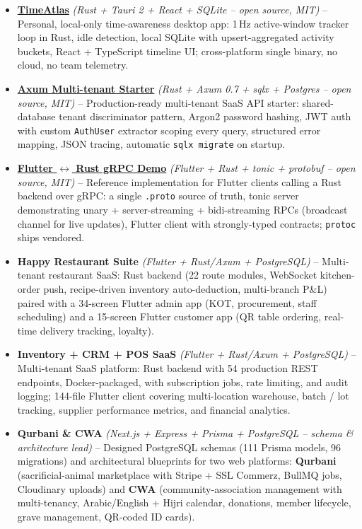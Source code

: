\documentclass[a4paper,10pt]{article}
\begin{document}
\begin{itemize}[leftmargin=*, noitemsep, topsep=2pt, parsep=0pt, partopsep=0pt]
    \item \href{https://github.com/Nahianether/rust-tauri-activity-monitor}{\textbf{TimeAtlas}} \textit{(Rust + Tauri 2 + React + SQLite -- open source, MIT)} -- Personal, local-only time-awareness desktop app: 1\,Hz active-window tracker loop in Rust, idle detection, local SQLite with upsert-aggregated activity buckets, React + TypeScript timeline UI; cross-platform single binary, no cloud, no team telemetry.
    \item \href{https://github.com/Nahianether/rust-axum-multitenant-starter}{\textbf{Axum Multi-tenant Starter}} \textit{(Rust + Axum 0.7 + sqlx + Postgres -- open source, MIT)} -- Production-ready multi-tenant SaaS API starter: shared-database tenant discriminator pattern, Argon2 password hashing, JWT auth with custom \texttt{AuthUser} extractor scoping every query, structured error mapping, JSON tracing, automatic \texttt{sqlx migrate} on startup.
    \item \href{https://github.com/Nahianether/flutter-rust-grpc-demo}{\textbf{Flutter $\leftrightarrow$ Rust gRPC Demo}} \textit{(Flutter + Rust + tonic + protobuf -- open source, MIT)} -- Reference implementation for Flutter clients calling a Rust backend over gRPC: a single \texttt{.proto} source of truth, tonic server demonstrating unary + server-streaming + bidi-streaming RPCs (broadcast channel for live updates), Flutter client with strongly-typed contracts; \texttt{protoc} ships vendored.
    \item \textbf{Happy Restaurant Suite} \textit{(Flutter + Rust/Axum + PostgreSQL)} -- Multi-tenant restaurant SaaS: Rust backend (22 route modules, WebSocket kitchen-order push, recipe-driven inventory auto-deduction, multi-branch P\&L) paired with a 34-screen Flutter admin app (KOT, procurement, staff scheduling) and a 15-screen Flutter customer app (QR table ordering, real-time delivery tracking, loyalty).
    \item \textbf{Inventory + CRM + POS SaaS} \textit{(Flutter + Rust/Axum + PostgreSQL)} -- Multi-tenant SaaS platform: Rust backend with 54 production REST endpoints, Docker-packaged, with subscription jobs, rate limiting, and audit logging; 144-file Flutter client covering multi-location warehouse, batch / lot tracking, supplier performance metrics, and financial analytics.
    \item \textbf{Qurbani \& CWA} \textit{(Next.js + Express + Prisma + PostgreSQL -- schema \& architecture lead)} -- Designed PostgreSQL schemas (111 Prisma models, 96 migrations) and architectural blueprints for two web platforms: \textbf{Qurbani} (sacrificial-animal marketplace with Stripe + SSL Commerz, BullMQ jobs, Cloudinary uploads) and \textbf{CWA} (community-association management with multi-tenancy, Arabic/English + Hijri calendar, donations, member lifecycle, grave management, QR-coded ID cards).

\end{itemize}
\end{document}
